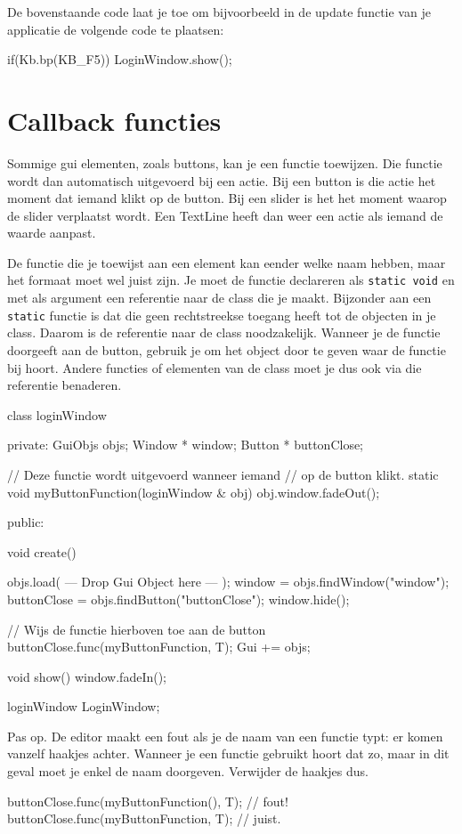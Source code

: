 De bovenstaande code laat je toe om bijvoorbeeld in de update functie van je applicatie de volgende code te plaatsen:

\begin{code}
if(Kb.bp(KB_F5)) LoginWindow.show();
\end{code}

\section{Callback functies}
Sommige gui elementen, zoals buttons, kan je een functie toewijzen. Die functie wordt dan automatisch uitgevoerd bij een actie. Bij een button is die actie het moment dat iemand klikt op de button. Bij een slider is het het moment waarop de slider verplaatst wordt. Een TextLine heeft dan weer een actie als iemand de waarde aanpast.

De functie die je toewijst aan een element kan eender welke naam hebben, maar het formaat moet wel juist zijn. Je moet de functie declareren als \texttt{static void} en met als argument een referentie naar de class die je maakt. Bijzonder aan een \texttt{static} functie is dat die geen rechtstreekse toegang heeft tot de objecten in je class. Daarom is de referentie naar de class noodzakelijk. Wanneer je de functie doorgeeft aan de button, gebruik je  om het object door te geven waar de functie bij hoort. Andere functies of elementen van de class moet je dus ook via die referentie benaderen.

\begin{code}
class loginWindow
{
private:
   GuiObjs objs;
	 Window * window;
	 Button * buttonClose;
    
	 // Deze functie wordt uitgevoerd wanneer iemand
	 // op de button klikt.
   static void myButtonFunction(loginWindow & obj) {
		  obj.window.fadeOut();
	 }
	
public:

   void create()
   {
      objs.load( --- Drop Gui Object here --- );
      window = objs.findWindow("window");
			buttonClose = objs.findButton("buttonClose");
			window.hide();
			
			// Wijs de functie hierboven toe aan de button
			buttonClose.func(myButtonFunction, T);
      Gui += objs;
   }
	
	 void show() {
	    window.fadeIn();
   }
}
loginWindow LoginWindow;
\end{code}

\begin{note}
Pas op. De editor maakt een fout als je de naam van een functie typt: er komen vanzelf haakjes achter. Wanneer je een functie gebruikt hoort dat zo, maar in dit geval moet je enkel de naam doorgeven. Verwijder de haakjes dus.
\begin{code}
buttonClose.func(myButtonFunction(), T); // fout!
buttonClose.func(myButtonFunction, T);   // juist.
\end{code}
\end{note}

